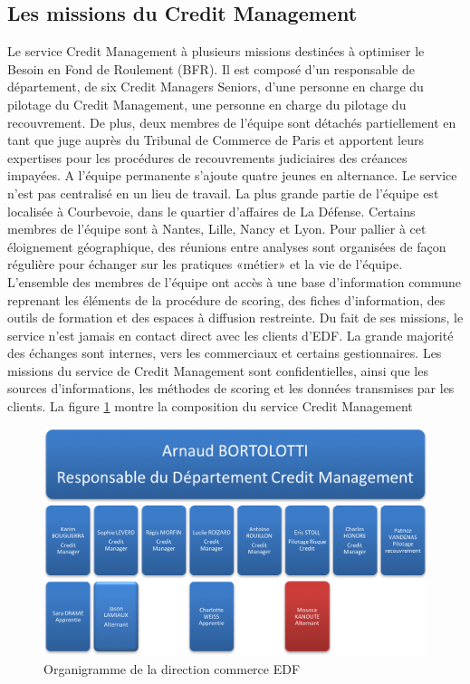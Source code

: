 \documentclass[11pt,a4paper]{article}
\begin{document}
\subsection{Les missions du Credit Management}
Le service Credit Management à plusieurs missions destinées à optimiser le Besoin en Fond de Roulement (BFR). 
Il est composé d’un responsable de département, de six Credit Managers Seniors, d’une personne en charge du pilotage du Credit Management, une personne en charge du pilotage du recouvrement. 
De plus, deux membres de l'équipe sont détachés partiellement en tant que juge auprès du Tribunal de Commerce de Paris et apportent leurs expertises pour les procédures de recouvrements judiciaires des créances impayées. A l’équipe permanente s’ajoute quatre jeunes en alternance. 
Le service n’est pas centralisé en un lieu de travail. 
La plus grande partie de l’équipe est localisée à Courbevoie, dans le quartier d’affaires de La Défense. Certains membres de l’équipe sont à Nantes, Lille, Nancy et Lyon.
Pour pallier à cet éloignement géographique, des réunions entre analyses sont organisées de façon régulière pour échanger sur les pratiques «métier» et la vie de l’équipe. L’ensemble des membres de l’équipe ont accès à une base d’information commune reprenant les éléments de la procédure de scoring, des fiches d’information, des outils de formation et des espaces à diffusion restreinte.
Du fait de ses missions, le service n’est jamais en contact direct avec les clients d’EDF. La grande majorité des échanges sont internes, vers les commerciaux et certains gestionnaires. Les missions du service de Credit Management sont confidentielles, ainsi que les sources d’informations, les méthodes de scoring et les données transmises par les clients. La figure \ref{figure_cm} montre la composition du service Credit Management
\begin{figure}[h]
 \centering
 \includegraphics[scale=0.9]{cm_organigramme.png}
 \caption{Organigramme de la direction commerce EDF}
 \label{figure_cm}
\end{figure}
\end{document}
